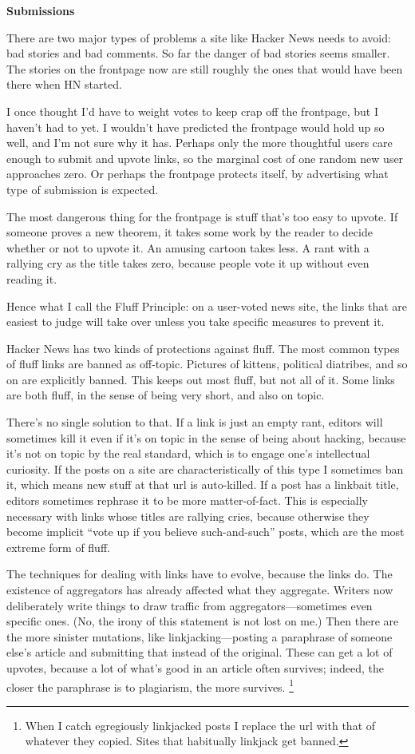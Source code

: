 \documentclass[12pt]{book}
\begin{document}
\textbf{Submissions}

There are two major types of problems a site like Hacker News needs to
avoid: bad stories and bad comments. So far the danger of bad stories
seems smaller. The stories on the frontpage now are still roughly the
ones that would have been there when HN started.

I once thought I'd have to weight votes to keep crap off the frontpage,
but I haven't had to yet. I wouldn't have predicted the frontpage would
hold up so well, and I'm not sure why it has. Perhaps only the more
thoughtful users care enough to submit and upvote links, so the marginal
cost of one random new user approaches zero. Or perhaps the frontpage
protects itself, by advertising what type of submission is expected.

The most dangerous thing for the frontpage is stuff that's too easy to
upvote. If someone proves a new theorem, it takes some work by the
reader to decide whether or not to upvote it. An amusing cartoon takes
less. A rant with a rallying cry as the title takes zero, because people
vote it up without even reading it.

Hence what I call the Fluff Principle: on a user-voted news site, the
links that are easiest to judge will take over unless you take specific
measures to prevent it.

Hacker News has two kinds of protections against fluff. The most common
types of fluff links are banned as off-topic. Pictures of kittens,
political diatribes, and so on are explicitly banned. This keeps out
most fluff, but not all of it. Some links are both fluff, in the sense
of being very short, and also on topic.

There's no single solution to that. If a link is just an empty rant,
editors will sometimes kill it even if it's on topic in the sense of
being about hacking, because it's not on topic by the real standard,
which is to engage one's intellectual curiosity. If the posts on a site
are characteristically of this type I sometimes ban it, which means new
stuff at that url is auto-killed. If a post has a linkbait title,
editors sometimes rephrase it to be more matter-of-fact. This is
especially necessary with links whose titles are rallying cries, because
otherwise they become implicit ``vote up if you believe such-and-such''
posts, which are the most extreme form of fluff.

The techniques for dealing with links have to evolve, because the links
do. The existence of aggregators has already affected what they
aggregate. Writers now deliberately write things to draw traffic from
aggregators---sometimes even specific ones. (No, the irony of this
statement is not lost on me.) Then there are the more sinister
mutations, like linkjacking---posting a paraphrase of someone else's
article and submitting that instead of the original. These can get a lot
of upvotes, because a lot of what's good in an article often survives;
indeed, the closer the paraphrase is to plagiarism, the more survives.
\footnote{When I catch egregiously linkjacked posts I replace the url with
that of whatever they copied. Sites that habitually linkjack get banned.}
\end{document}
